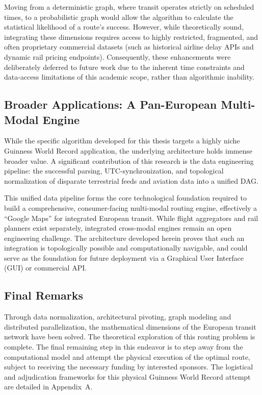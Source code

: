 Moving from a deterministic graph, where transit operates strictly on scheduled times, to a probabilistic graph would allow the algorithm to calculate the statistical likelihood of a route's success. However, while theoretically sound, integrating these dimensions requires access to highly restricted, fragmented, and often proprietary commercial datasets (such as historical airline delay APIs and dynamic rail pricing endpoints). Consequently, these enhancements were deliberately deferred to future work due to the inherent time constraints and data-access limitations of this academic scope, rather than algorithmic inability.

\subsection{Broader Applications: A Pan-European Multi-Modal Engine}
\label{subsec:broader_applications_pan_european_engine}

While the specific algorithm developed for this thesis targets a highly niche Guinness World Record application, the underlying architecture holds immense broader value. A significant contribution of this research is the data engineering pipeline: the successful parsing, UTC-synchronization, and topological normalization of disparate terrestrial feeds and aviation data into a unified DAG.

\medskip

This unified data pipeline forms the core technological foundation required to build a comprehensive, consumer-facing multi-modal routing engine, effectively a ``Google Maps'' for integrated European transit. While flight aggregators and rail planners exist separately, integrated cross-modal engines remain an open engineering challenge. The architecture developed herein proves that such an integration is topologically possible and computationally navigable, and could serve as the foundation for future deployment via a Graphical User Interface (GUI) or commercial API.

\subsection{Final Remarks}
\label{subsec:final_remarks}

Through data normalization, architectural pivoting, graph modeling and distributed parallelization, the mathematical dimensions of the European transit network have been solved. The theoretical exploration of this routing problem is complete. The final remaining step in this endeavor is to step away from the computational model and attempt the physical execution of the optimal route, subject to receiving the necessary funding by interested sponsors. The logistical and adjudication frameworks for this physical Guinness World Record attempt are detailed in Appendix~A.